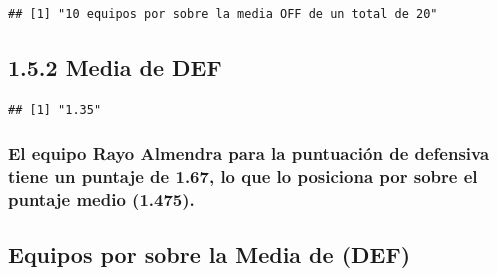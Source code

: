 \documentclass[]{article}
\newenvironment{Shaded}{\begin{snugshade}}{\end{snugshade}}
\newcommand{\CommentTok}[1]{\textcolor[rgb]{0.56,0.35,0.01}{\textit{#1}}}
\newcommand{\DataTypeTok}[1]{\textcolor[rgb]{0.13,0.29,0.53}{#1}}
\newcommand{\KeywordTok}[1]{\textcolor[rgb]{0.13,0.29,0.53}{\textbf{#1}}}
\newcommand{\NormalTok}[1]{#1}
\newcommand{\OperatorTok}[1]{\textcolor[rgb]{0.81,0.36,0.00}{\textbf{#1}}}
\newcommand{\OtherTok}[1]{\textcolor[rgb]{0.56,0.35,0.01}{#1}}
\newcommand{\StringTok}[1]{\textcolor[rgb]{0.31,0.60,0.02}{#1}}
\begin{document}
\begin{verbatim}
## [1] "10 equipos por sobre la media OFF de un total de 20"
\end{verbatim}

\hypertarget{media-de-def}{%
\subsection{1.5.2 Media de DEF}\label{media-de-def}}

\begin{Shaded}
\end{Shaded}

\begin{verbatim}
## [1] "1.35"
\end{verbatim}

\hypertarget{el-equipo-rayo-almendra-para-la-puntuacion-de-defensiva-tiene-un-puntaje-de-1.67-lo-que-lo-posiciona-por-sobre-el-puntaje-medio-1.475.}{%
\subsubsection{\texorpdfstring{El equipo Rayo Almendra para la
puntuación de defensiva tiene un puntaje de \textbf{1.67}, lo que lo
posiciona por sobre el puntaje medio
(1.475).}{El equipo Rayo Almendra para la puntuación de defensiva tiene un puntaje de 1.67, lo que lo posiciona por sobre el puntaje medio (1.475).}}\label{el-equipo-rayo-almendra-para-la-puntuacion-de-defensiva-tiene-un-puntaje-de-1.67-lo-que-lo-posiciona-por-sobre-el-puntaje-medio-1.475.}}

\hypertarget{equipos-por-sobre-la-media-de-def}{%
\subsection{Equipos por sobre la Media de
(DEF)}\label{equipos-por-sobre-la-media-de-def}}

\begin{Shaded}
\end{Shaded}
\end{document}
